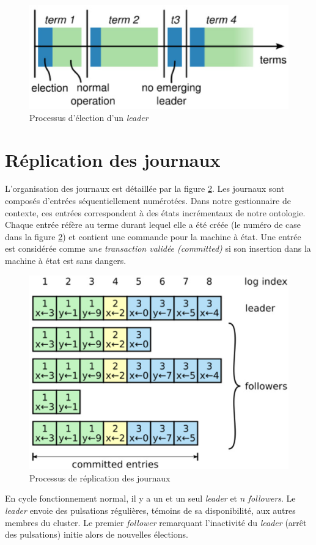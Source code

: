 \begin{figure}[H]
    \centerline{\includegraphics[width=.37\textwidth]{img/leader_election}}
    \caption{Processus d'élection d'un \emph{leader}}
    \label{fig:leader_election}
\end{figure}

\section{Réplication des journaux}

L'organisation des journaux est détaillée par la figure
\ref{fig:log_replication}.  Les journaux sont composés d'entrées
séquentiellement numérotées. Dans notre gestionnaire de contexte, ces entrées
correspondent à des états incrémentaux de notre ontologie. Chaque entrée réfère au terme
durant lequel elle a été créée (le numéro de case dans la figure
\ref{fig:log_replication}) et contient une commande pour la machine à état. Une
entrée est considérée comme \emph{une transaction validée (committed)} si son
insertion dans la machine à état est sans dangers.

\begin{figure}[H]
    \centerline{\includegraphics[width=.37\textwidth]{img/log_replication}}
    \caption{Processus de réplication des journaux}
    \label{fig:log_replication}
\end{figure}

En cycle fonctionnement normal, il y a un et un seul \emph{leader} et $n$
\emph{followers}. Le \emph{leader} envoie des pulsations régulières, témoins de
sa disponibilité, aux autres membres du cluster. Le premier \emph{follower}
remarquant l'inactivité du \emph{leader} (arrêt des pulsations) initie alors de
nouvelles élections. 

